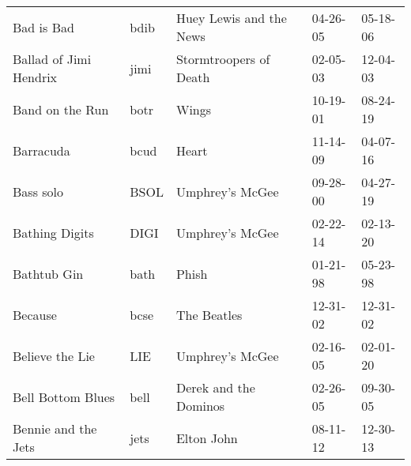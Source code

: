 \begin{longtable}{p{}p{}p{}p{}p{}}
                                                              Bad is Bad &          bdib &                                  Huey Lewis and the News &              04-26-05 &             05-18-06 \\
                                                  Ballad of Jimi Hendrix &          jimi &                                   Stormtroopers of Death &              02-05-03 &             12-04-03 \\
                                                         Band on the Run &          botr &                                                    Wings &              10-19-01 &             08-24-19 \\
                                                               Barracuda &          bcud &                                                    Heart &              11-14-09 &             04-07-16 \\
                                                               Bass solo &          BSOL &                                          Umphrey's McGee &              09-28-00 &             04-27-19 \\
                                                          Bathing Digits &          DIGI &                                          Umphrey's McGee &              02-22-14 &             02-13-20 \\
                                                             Bathtub Gin &          bath &                                                    Phish &              01-21-98 &             05-23-98 \\
                                                                 Because &          bcse &                                              The Beatles &              12-31-02 &             12-31-02 \\
                                                         Believe the Lie &           LIE &                                          Umphrey's McGee &              02-16-05 &             02-01-20 \\
                                                       Bell Bottom Blues &          bell &                                    Derek and the Dominos &              02-26-05 &             09-30-05 \\
                                                     Bennie and the Jets &          jets &                                               Elton John &              08-11-12 &             12-30-13 \\

\end{longtable}
